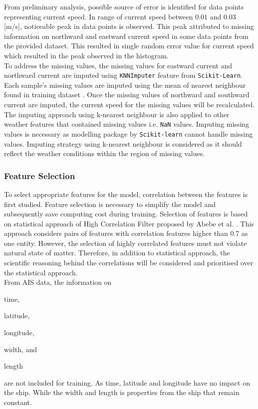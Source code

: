 From preliminary analysis, possible source of error is identified for data points representing current speed. In range of current speed between $0.01$ and $0.03$ [m/s], noticeable peak in data points is observed. This peak attributed to missing information on northward and eastward current speed in some data points from the provided dataset. This resulted in single random error value for current speed which resulted in the peak observed in the histogram.\\ 

To address the missing values, the missing values for eastward current and northward current are imputed using {\tt KNNImputer} feature from {\tt Scikit-Learn}. Each sample's missing values are imputed using the mean of nearest neighbour found in training dataset \cite{FabianPedregosa.2011}. Once the missing values of northward and southward current are imputed, the current speed for the missing values will be recalculated.\\ 

The imputing approach using k-nearest neighbour is also applied to other weather features that contained missing values i.e. {\tt NaN} values. Imputing missing values is necessary as modelling package by {\tt Scikit-learn} cannot handle missing values. Imputing strategy using k-nearest neighbour is considered as it should reflect the weather conditions within the region of missing values.\\

\subsubsection{Feature Selection}\label{feature_select}

To select appropriate features for the model, correlation between the features is first studied. Feature selection is necessary to simplify the model and subsequently save computing cost during training. Selection of features is based on statistical approach of High Correlation Filter proposed by Abebe et al. \cite{Abebe.2020}. This approach considers pairs of features with correlation features higher than 0.7 as one entity. However, the selection of highly correlated features must not violate natural state of matter. Therefore, in addition to statistical approach, the scientific reasoning behind the correlations will be considered and prioritised over the statistical approach.\\

From AIS data, the information on \begin{enumerate*}[label={(\arabic*)}]
    \item time,
    \item latitude,
    \item longitude,
    \item width, and
    \item length
\end{enumerate*} are not included for training. As time, latitude and longitude have no impact on the ship. While the width and length is properties from the ship that remain constant.\\  

